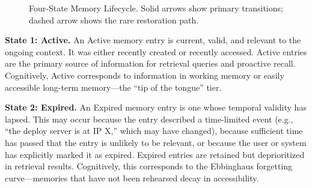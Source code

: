 \documentclass[11pt]{article}
\begin{document}
\begin{figure}[H]
\centering
{}
\caption{Four-State Memory Lifecycle. Solid arrows show primary transitions; dashed arrow shows the rare restoration path.}
\label{fig:lifecycle}
\end{figure}

\textbf{State 1: Active.} An Active memory entry is current, valid, and relevant to the ongoing context. It was either recently created or recently accessed. Active entries are the primary source of information for retrieval queries and proactive recall. Cognitively, Active corresponds to information in working memory or easily accessible long-term memory---the ``tip of the tongue'' tier.

\textbf{State 2: Expired.} An Expired memory entry is one whose temporal validity has lapsed. This may occur because the entry described a time-limited event (e.g., ``the deploy server is at IP X,'' which may have changed), because sufficient time has passed that the entry is unlikely to be relevant, or because the user or system has explicitly marked it as expired. Expired entries are retained but deprioritized in retrieval results. Cognitively, this corresponds to the Ebbinghaus forgetting curve---memories that have not been rehearsed decay in accessibility.
\end{document}
